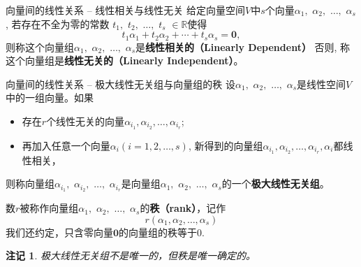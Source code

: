 \documentclass[10pt]{beamer}
\newtheorem{remark}[thm]{注记}
\begin{document}

\begin{frame}

\begin{block}{向量间的线性关系 -- 线性相关与线性无关}
给定向量空间$V$中$s$个向量$\alpha_1,$ $\alpha_2,$ $\ldots,$ $\alpha_s$, 若存在{\color{red}不全为零}的常数 $t_1,$ $t_2,$ $\dots,$ $t_s$ $\in \mathbb{R}$使得
$$t_1 \alpha_1 + t_2 \alpha_2 + \cdots + t_s \alpha_s = \mathbf{0},$$
则称这个向量组$\alpha_1,$ $\alpha_2,$ $\ldots,$ $\alpha_s$是{\bfseries 线性相关的（Linearly Dependent）}
\newline \pause \vspace{1em}
否则, 称这个向量组是{\bfseries 线性无关的（Linearly Independent）}。
\end{block}

\end{frame}


\begin{frame}

\begin{block}{向量间的线性关系 -- 极大线性无关组与向量组的秩}
设$\alpha_1,$ $\alpha_2,$ $\ldots,$ $\alpha_s$是线性空间$V$中的一组向量。如果
\begin{itemize}
\item 存在$r$个线性无关的向量$\alpha_{i_1}, \alpha_{i_2}, \ldots, \alpha_{i_r}$;
\item 再加入任意一个向量$\alpha_i (i=1,2,\ldots,s)$, 新得到的向量组$\alpha_{i_1}, \alpha_{i_2}, \ldots, \alpha_{i_r}, \alpha_i$都线性相关，
\end{itemize}
则称向量组$\alpha_{i_1},$ $\alpha_{i_2},$ $\ldots,$ $\alpha_{i_r}$是向量组$\alpha_1,$ $\alpha_2,$ $\ldots,$ $\alpha_s$的一个{\bfseries 极大线性无关组}。

\pause

数$r$被称作向量组$\alpha_1,$ $\alpha_2,$ $\ldots,$ $\alpha_s$的{\bfseries 秩（rank）}，记作
$$r(\alpha_1, \alpha_2, \ldots, \alpha_s)$$
我们还约定，只含零向量$\mathbf{0}$的向量组的秩等于$0$.
\end{block}

\begin{remark}
极大线性无关组{\color{red}不是}唯一的，但秩是唯一确定的。
\end{remark}

\end{frame}

\end{document}
